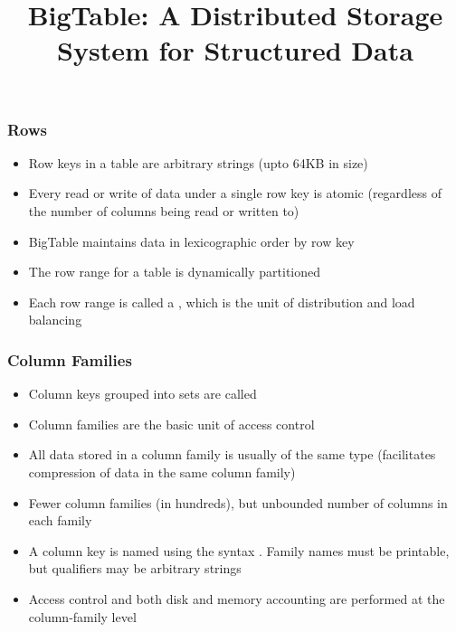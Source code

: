 \documentclass[12pt]{beamer}
\title{BigTable: A Distributed Storage System for Structured Data}
\begin{document}
\maketitle

\begin{frame}
  \frametitle{Rows}
  \begin{itemize}
    \addtolength{\itemsep}{10pt}
    \item Row keys in a table are arbitrary strings (upto 64KB in size)
    \item Every read or write of data under a single row  key is atomic (regardless of the number of columns
          being read or written to)
    \item BigTable maintains data in lexicographic order by row key
    \item The row range for a table is dynamically partitioned
    \item Each row range is called a {\color{red}{tablet}}, which is the unit of distribution and load balancing
  \end{itemize}
\end{frame}

\begin{frame}
  \frametitle{Column Families}
  \begin{itemize}
    \addtolength{\itemsep}{5pt}
    \item Column keys grouped into sets are called {\color{red}{column families}}
    \item Column families are the basic unit of access control
    \item All data stored in a column family is usually of the same type (facilitates compression of data in
    	  the same column family)
	\item Fewer column families (in hundreds), but unbounded number of columns in each family
	\item A column key is named using the syntax {\color{red}{family:qualifier}}. Family names must be printable,
		  but qualifiers may be arbitrary strings
    \item Access control and both disk and memory accounting are performed at the column-family level
  \end{itemize}
\end{frame}
\end{document}
